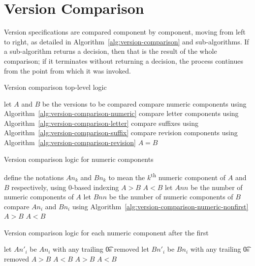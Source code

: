 \section{Version Comparison}

Version specifications are compared component by component, moving from left to right,
as detailed in Algorithm~\ref{alg:version-comparison} and sub-algorithms.
If a sub-algorithm returns a decision, then that is the result of the whole comparison;
if it terminates without returning a decision, the process continues from the point
from which it was invoked.

\begin{algorithm}
\caption{Version comparison top-level logic} \label{alg:version-comparison}
\begin{algorithmic}[1]
    \STATE let $A$ and $B$ be the versions to be compared
    \STATE compare numeric components using Algorithm~\ref{alg:version-comparison-numeric}
    \STATE compare letter components using Algorithm~\ref{alg:version-comparison-letter}
    \STATE compare suffixes using Algorithm~\ref{alg:version-comparison-suffix}
    \STATE compare revision components using Algorithm~\ref{alg:version-comparison-revision}
    \RETURN $A=B$
\end{algorithmic}
\end{algorithm}

\begin{algorithm}
\caption{Version comparison logic for numeric components} \label{alg:version-comparison-numeric}
\begin{algorithmic}[1]
  \STATE define the notations $An_k$ and $Bn_k$ to mean the $k$\textsuperscript{th} numeric
      component of $A$ and $B$ respectively, using $0$-based indexing
    \RETURN $A>B$
    \RETURN $A<B$
  \ENDIF
  \STATE let $Ann$ be the number of numeric components of $A$
  \STATE let $Bnn$ be the number of numeric components of $B$
    \STATE compare $An_i$ and $Bn_i$ using Algorithm~\ref{alg:version-comparison-numeric-nonfirst}
  \ENDFOR
    \RETURN $A>B$
    \RETURN $A<B$
  \ENDIF
\end{algorithmic}
\end{algorithm}

\begin{algorithm}
\caption{Version comparison logic for each numeric component after the first}
\label{alg:version-comparison-numeric-nonfirst}
\begin{algorithmic}[1]
    \STATE let $An'_i$ be $An_i$ with any trailing \t{0}s removed
    \STATE let $Bn'_i$ be $Bn_i$ with any trailing \t{0}s removed
      \RETURN $A>B$
      \RETURN $A<B$
    \ENDIF
  \ELSE
      \RETURN $A>B$
      \RETURN $A<B$
    \ENDIF
  \ENDIF
\end{algorithmic}
\end{algorithm}

